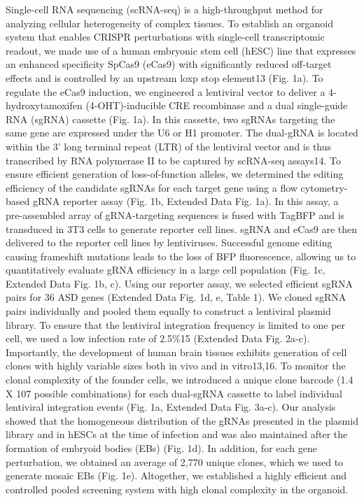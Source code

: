 Single-cell RNA sequencing (scRNA-seq) is a high-throughput method for analyzing cellular heterogeneity of complex tissues. To establish an organoid system that enables CRISPR perturbations with single-cell transcriptomic readout, we made use of a human embryonic stem cell (hESC) line that expresses an enhanced specificity SpCas9 (eCas9) with significantly reduced off-target effects and is controlled by an upstream loxp stop element13 (Fig. 1a). To regulate the eCas9 induction, we engineered a lentiviral vector to deliver a 4-hydroxytamoxifen (4-OHT)-inducible CRE recombinase and a dual single-guide RNA (sgRNA) cassette (Fig. 1a). In this cassette, two sgRNAs targeting the same gene are expressed under the U6 or H1 promoter. The dual-gRNA is located within the 3’ long terminal repeat (LTR) of the lentiviral vector and is thus transcribed by RNA polymerase II to be captured by scRNA-seq assays14. To ensure efficient generation of loss-of-function alleles, we determined the editing efficiency of the candidate sgRNAs for each target gene using a flow cytometry-based gRNA reporter assay (Fig. 1b, Extended Data Fig. 1a). In this assay, a pre-assembled array of gRNA-targeting sequences is fused with TagBFP and is transduced in 3T3 cells to generate reporter cell lines. sgRNA and eCas9 are then delivered to the reporter cell lines by lentiviruses. Successful genome editing causing frameshift mutations leads to the loss of BFP fluorescence, allowing us to quantitatively evaluate gRNA efficiency in a large cell population (Fig. 1c, Extended Data Fig. 1b, c). Using our reporter assay, we selected efficient sgRNA pairs for 36 ASD genes (Extended Data Fig. 1d, e, Table 1).  
We cloned sgRNA pairs individually and pooled them equally to construct a lentiviral plasmid library. To ensure that the lentiviral integration frequency is limited to one per cell, we used a low infection rate of 2.5\%15 (Extended Data Fig. 2a-c). Importantly, the development of human brain tissues exhibits generation of cell clones with highly variable sizes both in vivo and in vitro13,16. To monitor the clonal complexity of the founder cells, we introduced a unique clone barcode (1.4 X 107 possible combinations) for each dual-sgRNA cassette to label individual lentiviral integration events (Fig. 1a, Extended Data Fig. 3a-c). Our analysis showed that the homogeneous distribution of the gRNAs presented in the plasmid library and in hESCs at the time of infection and was also maintained after the formation of embryoid bodies (EBs) (Fig. 1d). In addition, for each gene perturbation, we obtained an average of 2,770 unique clones, which we used to generate mosaic EBs (Fig. 1e). Altogether, we established a highly efficient and controlled pooled screening system with high clonal complexity in the organoid. 

